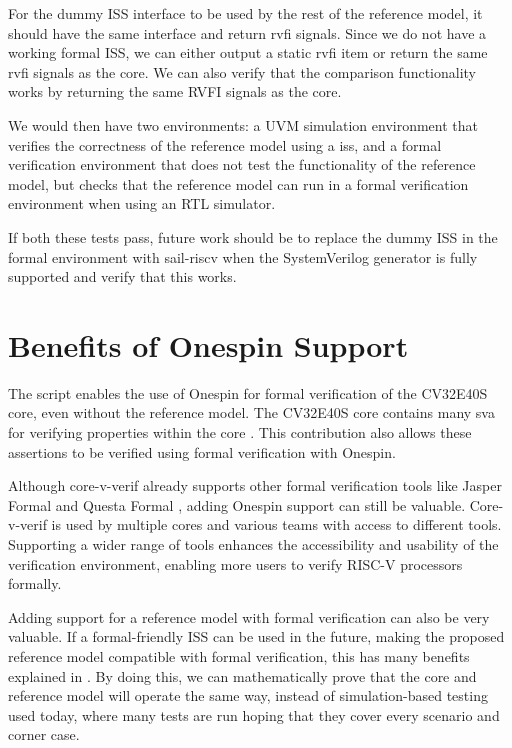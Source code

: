 For the dummy ISS interface to be used by the rest of the reference model, it should have the same interface and return \acrshort{rvfi} signals. Since we do not have a working formal ISS, we can either output a static \acrshort{rvfi} item or return the same \acrshort{rvfi} signals as the core. We can also verify that the comparison functionality works by returning the same RVFI signals as the core.


We would then have two environments: a UVM simulation environment that verifies the correctness of the reference model using a \cpp \acrshort{iss}, and a formal verification environment that does not test the functionality of the reference model, but checks that the reference model can run in a formal verification environment when using an RTL simulator.

If both these tests pass, future work should be to replace the dummy ISS in the formal environment with sail-riscv when the SystemVerilog generator is fully supported and verify that this works. 


\section{Benefits of Onespin Support}

The  script enables the use of Onespin for formal verification of the CV32E40S core, even without the reference model. The CV32E40S core contains many \acrfull{sva} for verifying properties within the core \cite{openhwgroupCv32e40s2024}. This contribution also allows these assertions to be verified using formal verification with Onespin.

Although core-v-verif already supports other formal verification tools like Jasper Formal \cite{JasperFormalVerification} and Questa Formal \cite{QuestaFormalVerification}, adding Onespin support can still be valuable. Core-v-verif is used by multiple cores and various teams with access to different tools. Supporting a wider range of tools enhances the accessibility and usability of the verification environment, enabling more users to verify RISC-V processors formally.

Adding support for a reference model with formal verification can also be very valuable. If a formal-friendly ISS can be used in the future, making the proposed reference model compatible with formal verification, this has many benefits explained in . By doing this, we can mathematically prove that the core and reference model will operate the same way, instead of simulation-based testing used today, where many tests are run hoping that they cover every scenario and corner case.